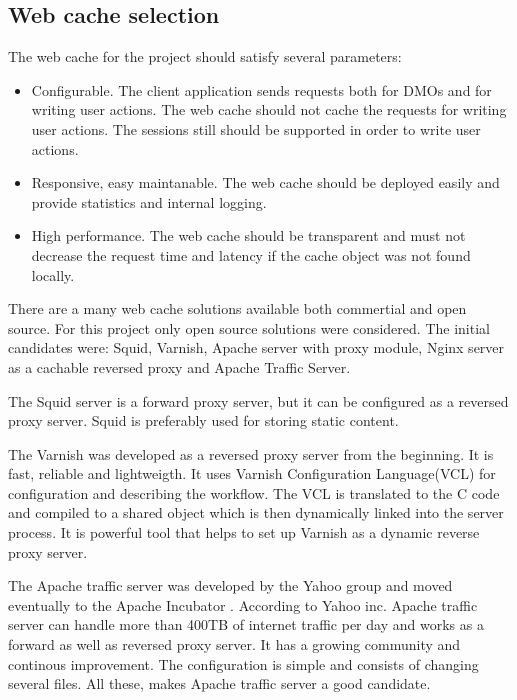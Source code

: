 
\subsection{Web cache selection}

The web cache for the project should satisfy several parameters:
\begin{itemize}
	\item Configurable. The client application sends requests both for DMOs and for writing user actions. The web cache should not cache the requests for writing user actions. The sessions still should be supported in order to write user actions. 
	\item Responsive, easy maintanable. The web cache should be deployed easily and provide statistics and internal logging. 
	\item High performance. The web cache should be transparent and must not decrease the request time and latency if the cache object was not found locally. 
\end{itemize}

There are a many web cache solutions available both commertial and open source. For this project only open source solutions were considered. The initial candidates were: Squid, Varnish, Apache server with proxy module, Nginx server as a cachable reversed proxy and Apache Traffic Server.

The Squid server is a forward proxy server, but it can be configured as a reversed proxy server. Squid is preferably used for storing static content.

The Varnish was developed as a reversed proxy server from the beginning. It is fast, reliable and lightweigth. It uses Varnish Configuration Language(VCL) for configuration and describing the workflow. The VCL is translated to the C code and compiled to a shared object which is then dynamically linked into the server process. It is powerful tool that helps to set up Varnish as a dynamic reverse proxy server.

The Apache traffic server was developed by the Yahoo group and moved eventually to the Apache Incubator \cite{GuApacheTrafficUri}. According to Yahoo inc. Apache traffic server can handle more than 400TB of internet traffic per day and works as a forward as well as reversed proxy server. It has a growing community and continous improvement. The configuration is simple and consists of changing several files. All these, makes Apache traffic server a good candidate.  

